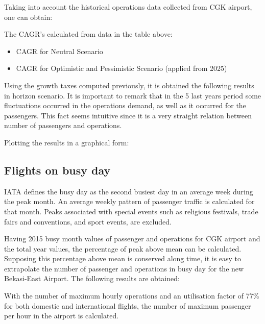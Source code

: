 Taking into account the historical operations data collected from CGK airport, one can obtain:
	
The CAGR's calculated from  data in the table above:
	\begin{itemize}
		\item CAGR for Neutral Scenario
		
		\item CAGR for Optimistic and Pessimistic Scenario (applied from 2025)
	\end{itemize}
	
Using the growth taxes computed previously, it is obtained the following results in horizon scenario. It is important to remark that in the 5 last years period some fluctuations occurred in the operations demand, as well as it occurred for the passengers. This fact seems intuitive since it is a very straight relation between number of passengers and operations.
	
Plotting the results in a graphical form:
	
	\subsection{Flights on busy day}
IATA defines the busy day as the second busiest day in an average week during the peak month. An average weekly pattern of passenger traffic is calculated for that month. Peaks associated with special events such as religious festivals, trade fairs and conventions, and sport events, are excluded.

Having 2015 busy month values of passenger and operations for CGK airport and the total year values, the percentage of peak above mean can be calculated. Supposing this percentage above mean is conserved along time, it is easy to extrapolate the number of passenger and operations in busy day for the new Bekasi-East Airport. The following results are obtained:


With the number of maximum hourly operations and an utilisation factor of 77\% for both domestic and international flights, the number of maximum passenger per hour in the airport is calculated.

	
	